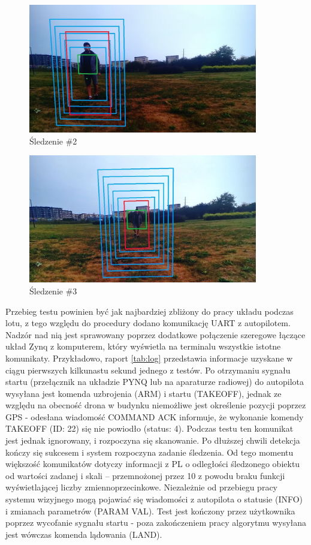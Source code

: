 \begin{figure}[h]
	\centering
	\includegraphics[width=10cm]{6_track_2.jpg}
	\caption{Śledzenie \#2}
	\label{fig:track_1}
\end{figure}

\begin{figure}[h]
	\centering
	\includegraphics[width=10cm]{6_track_3.jpg}
	\caption{Śledzenie \#3}
	\label{fig:track_1}
\end{figure}

 Przebieg testu powinien być jak najbardziej zbliżony do pracy układu podczas lotu, z tego względu do procedury dodano komunikację UART z autopilotem. Nadzór nad nią jest sprawowany poprzez dodatkowe połączenie szeregowe łączące układ Zynq z komputerem, który wyświetla na terminalu wszystkie istotne komunikaty. Przykładowo, raport \ref{tab:log} przedstawia informacje uzyskane w ciągu pierwszych kilkunastu sekund jednego z testów. Po otrzymaniu sygnału startu (przełącznik na układzie PYNQ lub na aparaturze radiowej) do autopilota wysyłana jest komenda uzbrojenia (ARM) i startu (TAKEOFF), jednak ze względu na obecność drona w budynku niemożliwe jest określenie pozycji poprzez GPS - odesłana wiadomość COMMAND ACK informuje, że wykonanie komendy TAKEOFF (ID: 22) się nie powiodło (status: 4). Podczas testu ten komunikat jest jednak ignorowany, i rozpoczyna się skanowanie. Po dłuższej chwili detekcja kończy się sukcesem i system rozpoczyna zadanie śledzenia. Od tego momentu większość komunikatów dotyczy informacji z PL o odległości śledzonego obiektu od wartości zadanej i skali -- przemnożonej przez 10 z powodu braku funkcji wyświetlającej liczby zmiennoprzecinkowe. Niezależnie od przebiegu pracy systemu wizyjnego mogą pojawiać się wiadomości z autopilota o statusie (INFO) i zmianach parametrów (PARAM VAL). Test jest kończony przez użytkownika poprzez wycofanie sygnału startu - poza zakończeniem pracy algorytmu wysyłana jest wówczas komenda lądowania (LAND).
 
